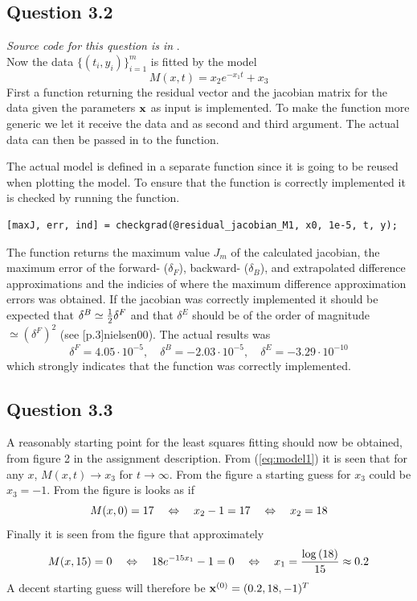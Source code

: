 \subsection*{Question 3.2}
\textit{Source code for this question is in }. \\
Now the data $\{(t_i, y_i)\}_{i=1}^m$ is fitted by the model
\begin{equation}\label{eq:model1}
    M(x, t) = x_2 e^{-x_1t} + x_3
\end{equation}
First a function returning the residual vector and the jacobian matrix for the data given the parameters $\mathbf{x}$ as input is implemented. To make the function more generic we let it receive the data  and  as second and third argument. The actual data can then be passed in to the  function.


The actual model is defined in a separate function  since it is going to be reused when plotting the model. To ensure that the function is correctly implemented it is checked by running the  function.
\begin{lstlisting}
[maxJ, err, ind] = checkgrad(@residual_jacobian_M1, x0, 1e-5, t, y);
\end{lstlisting}
The function returns the maximum value $J_m$ of the calculated jacobian, the maximum error of the forward- ($\delta_F$), backward- ($\delta_B$), and extrapolated difference approximations and the indicies of where the maximum difference approximation errors was obtained. If the jacobian was correctly implemented it should be expected that $\delta^B\simeq\frac{1}{2}\delta^F$ and that $\delta^E$ should be of the order of magnitude $\simeq(\delta^F)^2$ (see [p.3]{nielsen00}). The actual results was
\begin{equation*}
    \delta^F = 4.05\cdot10^{-5},\quad \delta^B = -2.03\cdot10^{-5},\quad \delta^E = -3.29\cdot10^{-10}
\end{equation*}
which strongly indicates that the  function was correctly implemented.

\subsection*{Question 3.3}
A reasonably starting point for the least squares fitting should now be obtained, from figure 2 in the assignment description. From (\ref{eq:model1}) it is seen that for any $x$, $M(x, t) \to x_3$ for $t\to\infty$. From the figure a starting guess for $x_3$ could be $x_3=-1$. From the figure is looks as if
\begin{equation*}
    M(x, 0) = 17 \quad\Leftrightarrow\quad x_2 - 1 = 17 \quad\Leftrightarrow\quad x_2 = 18
\end{equation*}
Finally it is seen from the figure that approximately
\begin{equation*}
    M(x, 15) = 0 \quad\Leftrightarrow\quad 18e^{-15x_1} - 1 = 0 \quad\Leftrightarrow\quad x_1 = \frac{\log{(18)}}{15} \approx 0.2
\end{equation*}
A decent starting guess will therefore be $\mathbf{x}^{(0)}=(0.2, 18, -1)^T$

